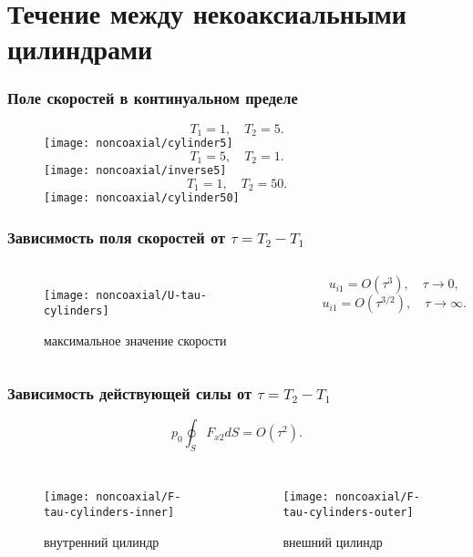 \documentclass[mathserif]{beamer} %
\newcommand{\dd}{d}%
\newcommand{\OO}[1]{O(#1)}
\begin{document}
\section{Течение между некоаксиальными цилиндрами}

\begin{frame}
    \frametitle{Поле скоростей в континуальном пределе}
    \centering
    \begin{figure}
    \begin{overprint}
            \[ T_1 = 1, \quad T_2 = 5.\]
            \hspace{-1cm}
            \texttt{[image: noncoaxial/cylinder5]}
            \[ T_1 = 5, \quad T_2 = 1.\]
            \hspace{-1cm}
            \texttt{[image: noncoaxial/inverse5]}
            \[ T_1 = 1, \quad T_2 = 50.\]
            \hspace{-1cm}
            \texttt{[image: noncoaxial/cylinder50]}
    \end{overprint}
    \hspace{-.5cm}
    \end{figure}
\end{frame}

\begin{frame}
    \frametitle{Зависимость поля скоростей от \(\tau = T_2-T_1\)}
    \centering
    \begin{columns}
        \begin{figure}
            \texttt{[image: noncoaxial/U-tau-cylinders]}
            \vspace{-.5cm}\caption{максимальное значение скорости}
        \end{figure}
        \[ u_{i1} = \OO{\tau^3}, \quad \tau\to0, \]
        \[ u_{i1} = \OO{\tau^{3/2}}, \quad \tau\to\infty. \]
    \end{columns}
\end{frame}

\begin{frame}
    \frametitle{Зависимость действующей силы от \(\tau = T_2-T_1\)}
    \vspace{-.2cm}
    \[ p_0 \oint_S F_{x2}\dd{S} = \OO{\tau^2}. \]
    \vspace{-.7cm}
    \begin{columns}
        \begin{figure}
            \texttt{[image: noncoaxial/F-tau-cylinders-inner]}
            \vspace{-.5cm}\caption{внутренний цилиндр}
        \end{figure}
        \begin{figure}
            \texttt{[image: noncoaxial/F-tau-cylinders-outer]}
            \vspace{-.5cm}\caption{внешний цилиндр}
        \end{figure}
    \end{columns}
\end{frame}
\end{document}
